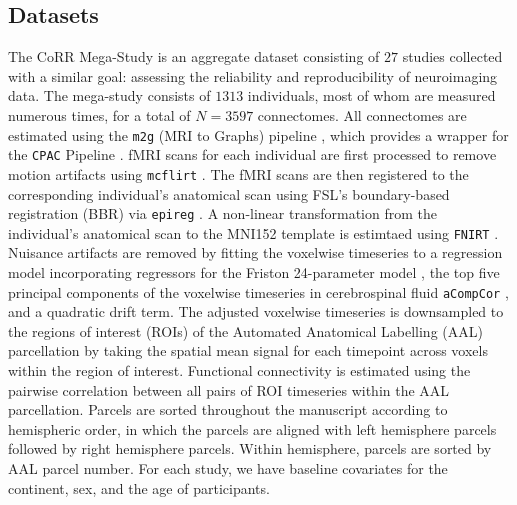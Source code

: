 



\subsection{Datasets}
\label{sec:corr_descr}
The CoRR Mega-Study \cite{corr} is an aggregate dataset consisting of $27$ studies collected with a similar goal: assessing the reliability and reproducibility of neuroimaging data. The mega-study consists of $1313$ individuals, most of whom are measured numerous times, for a total of $N=3597$ connectomes. All connectomes are estimated using the \texttt{m2g} (MRI to Graphs) pipeline \cite{m2g}, which provides a wrapper for the \texttt{CPAC} Pipeline \cite{cpac}. fMRI scans for each individual are first processed to remove motion artifacts using \texttt{mcflirt} \cite{flirt}. The fMRI scans are then registered to the corresponding individual's anatomical scan using FSL's boundary-based registration (BBR) via \texttt{epireg} \cite{epireg}. A non-linear transformation from the individual's anatomical scan to the MNI152 \cite{mni152} template is estimtaed using \texttt{FNIRT} \cite{fnirt}. Nuisance artifacts are removed by fitting the voxelwise timeseries to a regression model incorporating regressors for the Friston 24-parameter model \cite{friston24}, the top five principal components of the voxelwise timeseries in cerebrospinal fluid \texttt{aCompCor} \cite{acompcor}, and a quadratic drift term. The adjusted voxelwise timeseries is downsampled to the regions of interest (ROIs) of the Automated Anatomical Labelling (AAL) parcellation \cite{aal} by taking the spatial mean signal for each timepoint across voxels within the region of interest. Functional connectivity is estimated using the pairwise correlation between all pairs of ROI timeseries within the AAL parcellation. Parcels are sorted throughout the manuscript according to hemispheric order, in which the parcels are aligned with left hemisphere parcels followed by right hemisphere parcels. Within hemisphere, parcels are sorted by AAL parcel number. For each study, we have baseline covariates for the continent, sex, and the age of participants.


